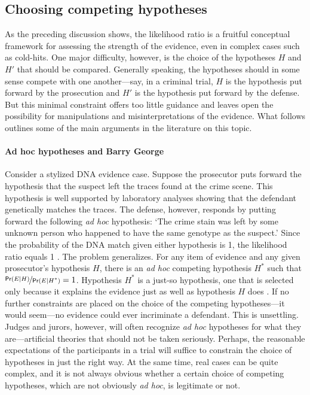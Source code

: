 \documentclass{article}
\newcommand{\pr}{\mathsf{Pr}}
\begin{document}
\subsection{Choosing competing hypotheses}
 \label{subsec:chose-h}
 
As the preceding discussion shows, the likelihood ratio is a fruitful conceptual framework for assessing the strength of the evidence, even in complex cases such as cold-hits. 
One major difficulty, however,  is the choice of  the hypotheses $H$ and $H'$ that should be compared. Generally speaking, the hypotheses should in some sense compete with one another---say, in a criminal trial, $H$ is the hypothesis put forward by the prosecution and $H'$ is the hypothesis put forward by the defense. %
But this minimal constraint offers too little guidance and leaves open the possibility for manipulations and misinterpretations of the evidence. What follows outlines some of the main arguments in the literature on this topic. 



\paragraph{Ad hoc hypotheses and Barry George}

Consider a stylized DNA evidence case. Suppose the prosecutor puts forward the hypothesis that the suspect left the traces found at the crime scene. This hypothesis is well supported by laboratory analyses showing that the defendant genetically matches the traces. 
The defense, however, responds by putting forward the following \textit{ad hoc} hypothesis:  `The crime stain was left by some unknown person who happened to have the same genotype as the suspect.' Since the probability of the DNA match given either hypothesis is 1, the likelihood ratio equals 1 \citep{evett2000MoreHierarchyPropositions}. The problem generalizes. For any item of evidence and any given prosecutor's hypothesis $H$, there is an \textit{ad hoc} competing hypothesis $H^*$ such that $\nicefrac{\pr(E \vert H)}{\pr(E \vert H^*)}=1$.
Hypothesis $H^*$ is a just-so hypothesis, one that is selected only because it explains the evidence just as well as hypothesis $H$ does \citep{mayo2018}. 
%
If no further constraints are placed on the choice of the competing hypotheses---it would seem---no evidence could ever  incriminate a defendant. This is  unsettling. 
Judges and jurors, however, will often recognize \textit{ad hoc} hypotheses for what they are---artificial theories that should not be taken seriously. Perhaps, the reasonable expectations of the participants in a trial will suffice to constrain the choice of hypotheses in just the right way. At the same time, real cases can be quite complex, and it is not always obvious whether a certain choice of competing hypotheses, which are not obviously \textit{ad hoc}, is legitimate or not. 
\end{document}
